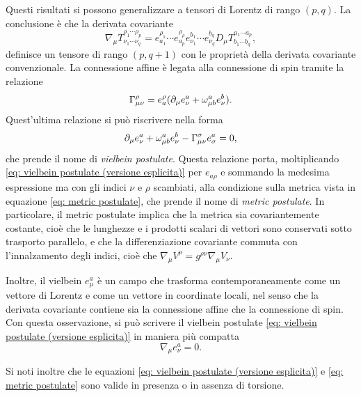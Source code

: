 Questi risultati si possono generalizzare a tensori di Lorentz di rango $(p, q)$. La conclusione è che la derivata covariante 
\begin{equation}
    \nabla_\mu T^{\rho_1\cdots \rho_p}_{\nu_1\cdots\nu_q} = e^{\rho_1}_{a_1}\cdots e^{\rho_\rho}_{a_p}e^{b_1}_{\nu_1}\cdots e^{b_q}_{\nu_q}D_\mu T^{a_1\cdots a_p}_{b_1\cdots b_q},
\end{equation}
definisce un tensore di rango $(p, q + 1)$ con le proprietà della derivata covariante convenzionale. La connessione affine è legata alla connessione di spin tramite la relazione
\begin{equation}
    \Gamma^\rho_{\mu\nu} = e^\rho_a(\partial_\mu e^a_\nu + \omega^a_{\mu b}e^b_\nu).    
\end{equation}
Quest'ultima relazione si può riscrivere nella forma 
\begin{equation}
\label{eq: vielbein postulate (versione esplicita)}
    \partial_\mu e^a_\nu + \omega^a_{\mu b}e^b_\nu - \Gamma^\sigma_{\mu\nu}e^a_\sigma = 0,
\end{equation}
che prende il nome di \emph{vielbein postulate}. Questa relazione porta, moltiplicando \eqref{eq: vielbein postulate (versione esplicita)} per $e_{a\rho}$ e sommando la medesima espressione ma con gli indici $\nu$ e $\rho$ scambiati, alla condizione sulla metrica vista in equazione \eqref{eq: metric postulate}, che prende il nome di \emph{metric postulate}. In particolare, il metric postulate implica che la metrica sia covariantemente costante, cioè che le lunghezze e i prodotti scalari di vettori sono conservati sotto trasporto parallelo, e che la differenziazione covariante commuta con l'innalzamento degli indici, cioè che $\nabla_\mu V^\rho = g^{\rho\nu}\nabla_\mu V_\nu$.

Inoltre, il vielbein $e^a_\mu$ è un campo che trasforma contemporaneamente come un vettore di Lorentz e come un vettore in coordinate locali, nel senso che la derivata covariante contiene sia la connessione affine che la connessione di spin. Con questa osservazione, si può scrivere il vielbein postulate \eqref{eq: vielbein postulate (versione esplicita)} in maniera più compatta 
\begin{equation}
\label{eq: vielbein postulate}
    \nabla_\mu e^a_\nu = 0.
\end{equation} 
\begin{obs}
    Si noti inoltre che le equazioni \eqref{eq: vielbein postulate (versione esplicita)} e \eqref{eq: metric postulate} sono valide in presenza o in assenza di torsione.
\end{obs}

